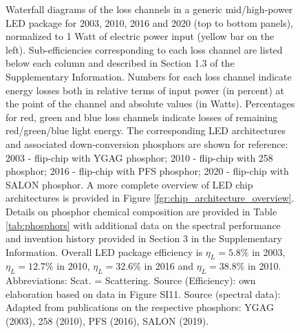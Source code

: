 \documentclass[parskip=full]{article}
\begin{document}
\begin{figure}[h!]
 \caption{Waterfall diagrams of the loss channels in a generic mid/high-power LED package for 2003, 2010, 2016 and 2020 (top to bottom panels), normalized to 1 Watt of electric power input (yellow bar on the left). Sub-efficiencies corresponding to each loss channel are listed below each column and described in Section 1.3 of the Supplementary Information. Numbers for each loss channel indicate energy losses both in relative terms of input power (in percent) at the point of the channel and absolute values (in Watts). Percentages for red, green and blue loss channels indicate losses of remaining red/green/blue light energy. The corresponding LED architectures and associated down-conversion phosphors are shown for reference: 2003 - flip-chip with YGAG phosphor; 2010 - flip-chip with 258 phosphor; 2016 - flip-chip with PFS phosphor; 2020 - flip-chip with SALON phosphor. A more complete overview of LED chip architectures is provided in Figure \ref{fgr:chip_architecture_overview}. Details on phosphor chemical composition are provided in Table \ref{tab:phosphors} with additional data on the spectral performance and invention history provided in Section 3 in the Supplementary Information. Overall LED package efficiency is $\eta_L = 5.8\%$ in 2003, $\eta_L = 12.7\%$ in 2010, $\eta_L = 32.6\%$ in 2016 and $\eta_L = 38.8\%$ in 2010. Abbreviations: Scat. = Scattering. Source (Efficiency): own elaboration based on data in Figure SI11. Source (spectral data): Adapted from publications on the respective phosphors: YGAG (2003)\cite{Mueller2002}, 258 (2010)\cite{MuellerMach2005}, PFS (2016)\cite{Murphy2015}, SALON (2019)\cite{Hoerder2019}.}
 \label{fgr:waterfall}
\end{figure}
\end{document}
